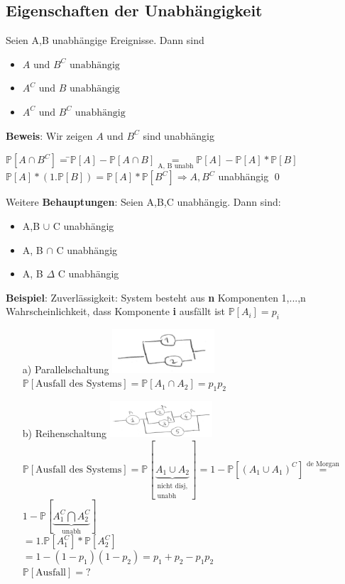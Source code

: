\subsection{Eigenschaften der Unabhängigkeit}
Seien A,B unabhängige Ereignisse. Dann sind
\begin{itemize}
	\item $A \text{ und } B^C \text{ unabhängig}$
	\item $A^C \text{ und } B \text{ unabhängig}$
	\item $A^C \text{ und } B^C \text{ unabhängig}$
\end{itemize}
\textbf{Beweis}: Wir zeigen $A \text{ und } B^C$ sind unabhängig
\begin{tabbing}
	$\mathds{P}[A\cap B^C] =$\=$ \mathds{P}[A]-\mathds{P}[A\cap B]\underset{\text{A, B unabh}}{=}\mathds{P}[A] - \mathds{P}[A]*\mathds{P}[B]$\\
	\>$\mathds{P}[A]*(1.\mathds{P}[B])=\mathds{P}[A]*\mathds{P}[B^C] \Rightarrow A, B^C $ unabhängig \qed
\end{tabbing}
Weitere \textbf{Behauptungen}: Seien A,B,C unabhängig. Dann sind:
\begin{itemize}
	\item A,B $\cup$ C unabhängig 
	\item A, B $\cap$ C unabhängig
	\item A, B $\Delta$ C unabhängig
\end{itemize}
\textbf{Beispiel}: Zuverlässigkeit: System besteht aus \textbf{n} Komponenten 1,...,n\\
Wahrscheinlichkeit, dass Komponente \textbf{i} ausfällt ist $\mathds{P}[A_i]=p_i$
\begin{enumerate}
	\item [a)] Parallelschaltung \includegraphics[width=0.3\textwidth]{img/parallel.PNG} \\
	$\mathds{P}[\text{Ausfall des Systems}] = \mathds{P}[A_1\cap A_2] = p_1p_2$
	\item [b)] Reihenschaltung \includegraphics[width=0.3\textwidth]{img/reihe.PNG}\\
	$\mathds{P}[\text{Ausfall des Systems}]= \mathds{P}[\underbrace{A_1 \cup A_2}_{\substack{\text{nicht disj,}\\\text{unabh}}}] = 1-\mathds{P}[(A_1 \cup A_1)^C]\overset{\text{de Morgan}}{=}$\smallskip\\
	$1-\mathds{P}[\underbrace{A_1^C \bigcap A_2^C}_\text{unabh}]$\smallskip\\
	$=1.\mathds{P}[A_1^C]*\mathds{P}[A_2^C]$\smallskip\\
	$=1-(1-p_1)(1-p_2)=p_1+p_2 - p_1p_2$\\

	$\mathds{P}[\text{Ausfall}] = ? $
\end{enumerate}

